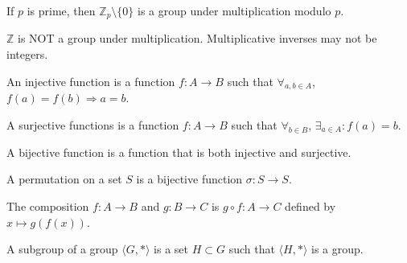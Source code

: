 \documentclass[crop=false,class=article,oneside]{standalone}
\begin{document}
            \begin{theorem}
            If $p$ is prime, then $\mathbb{Z}_p\setminus \{0\}$ is a group under multiplication modulo $p$.
            \end{theorem}
            \begin{remark}
            $\mathbb{Z}$ is NOT a group under multiplication. Multiplicative inverses may not be integers.
            \end{remark}
            \begin{definition}
            An injective function is a function $f:A\rightarrow B$ such that $\forall_{a,b\in A}$, $f(a)=f(b)\Rightarrow a=b$.
            \end{definition}
            \begin{definition}
            A surjective functions is a function $f:A\rightarrow B$ such that $\forall_{b\in B}$, $\exists_{a\in A}:f(a)=b$.
            \end{definition}
            \begin{definition}
            A bijective function is a function that is both injective and surjective.
            \end{definition}
            \begin{definition}
            A permutation on a set $S$ is a bijective function $\sigma:S\rightarrow S$.
            \end{definition}
            \begin{definition}
            The composition $f:A\rightarrow B$ and $g:B\rightarrow C$ is $g\circ f:A\rightarrow C$ defined by $x\mapsto g(f(x))$.
            \end{definition}
            \begin{definition}
            A subgroup of a group $\langle G,*\rangle$ is a set $H\subset G$ such that $\langle H,*\rangle$ is a group.
            \end{definition}
\end{document}
